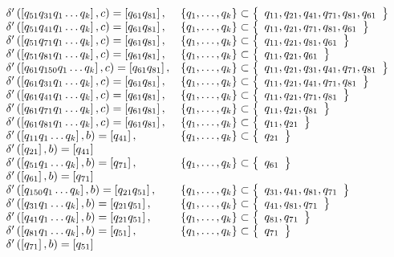 \begin{align*}
\begin{array}{ll}
		\gendelta{q_{51}q_{31}}{c}{q_{61}q_{81}}{\mcqc,q_{41},q_{71},q_{81},q_{61}}         \\
		\gendelta{q_{51}q_{41}}{c}{q_{61}q_{81}}{\mcqc,q_{71},q_{81},q_{61}}                \\
		\gendelta{q_{51}q_{71}}{c}{q_{61}q_{81}}{\mcqc,q_{81},q_{61}}                       \\
		\gendelta{q_{51}q_{81}}{c}{q_{61}q_{81}}{\mcqc,q_{61}}                              \\
		\gendelta{q_{61}q_{150}}{c}{q_{61}q_{81}}{\mcqc,q_{31},q_{41},q_{71},q_{81}}        \\
		\gendelta{q_{61}q_{31}}{c}{q_{61}q_{81}}{\mcqc,q_{41},q_{71},q_{81}}                \\
		\gendelta{q_{61}q_{41}}{c}{q_{61}q_{81}}{\mcqc,q_{71},q_{81}}                       \\
		\gendelta{q_{61}q_{71}}{c}{q_{61}q_{81}}{\mcqc,q_{81}}                              \\
		\gendelta{q_{61}q_{81}}{c}{q_{61}q_{81}}{\mcqc}                                     \\
		\gendelta{q_{11}}{b}{q_{41}}{q_{21}}                                                \\
		\gendelta{q_{21}}{b}{q_{41}}{}                                                      \\
		\gendelta{q_{51}}{b}{q_{71}}{q_{61}}                                                \\
		\gendelta{q_{61}}{b}{q_{71}}{}                                                      \\
		\gendelta{q_{150}}{b}{q_{21}q_{51}}{q_{31},q_{41},q_{81}, q_{71}}                   \\
		\gendelta{q_{31}}{b}{q_{21}q_{51}}{q_{41},q_{81}, q_{71}}                           \\
		\gendelta{q_{41}}{b}{q_{21}q_{51}}{q_{81}, q_{71}}                                  \\
		\gendelta{q_{81}}{b}{q_{51}}{q_{71}}                                                \\
		\gendelta{q_{71}}{b}{q_{51}}{}                                                      \\
	\end{array}
\end{align*}

